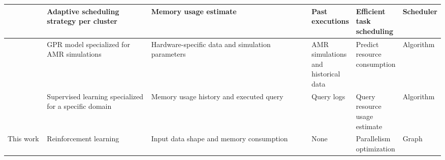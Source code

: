 \begin{table}[ht]
{\begin{tabular}{@{}|p{0.11\linewidth}|p{0.3\linewidth}|p{0.5\linewidth}|p{0.3\linewidth}|p{0.3\linewidth}|p{0.2\linewidth}|@{}}
      \cite{goponenko2020} & Adaptive scheduling strategy per cluster                      & Memory usage estimate                                                                                   & Past executions                                 & Efficient task scheduling      & Scheduler            \\ \midrule
      \cite{duplyakin2018} & \ac{GPR} model specialized for \ac{AMR} simulations           & Hardware-specific data and simulation parameters                                                        & \ac{AMR} simulations and historical data        & Predict resource consumption   & Algorithm            \\ \midrule
      \cite{tang2021}      & Supervised learning specialized for a specific domain         & Memory usage history and executed query                                                                 & Query logs                                      & Query resource usage estimate  & Algorithm            \\ \midrule
      This work            & Reinforcement learning                                        & Input data shape and memory consumption                                                                 & None                                            & Parallelism optimization       & Graph                \\ \midrule
    \end{tabular}
  }
\end{table}
